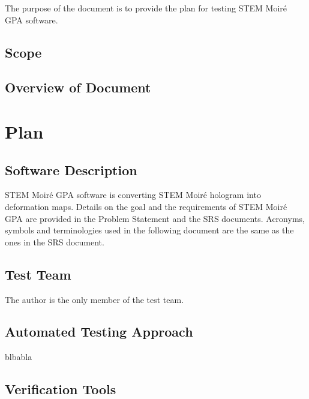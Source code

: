 \documentclass[12pt, titlepage]{article}
\newcommand{\progname}{STEM Moir{\'e} GPA}
\begin{document}
The purpose of the document is to provide the plan for testing \progname{} software. 

\subsection{Scope}

\subsection{Overview of Document}

\section{Plan}
	
\subsection{Software Description}

\progname{} software is converting STEM Moir{\'e} hologram into deformation maps. Details on the goal and the requirements of \progname{} are provided in the Problem Statement and the SRS documents. Acronyms, symbols and terminologies used in the following document are the same as the ones in the SRS document.

\subsection{Test Team}

The author is the only member of the test team.

\subsection{Automated Testing Approach}

blbabla

\subsection{Verification Tools}


		
\end{document}
